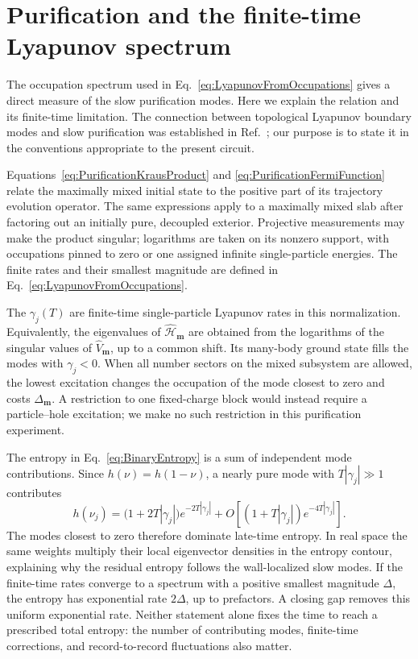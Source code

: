 \documentclass[aps,prb,10pt,twocolumn,superscriptaddress,longbibliography,floatfix]{revtex4-2}
\newcommand{\rec}{\mathbf m}   %
\begin{document}
{\color{blue}
\section{Purification and the finite-time Lyapunov spectrum}
\label{app:Lyapunov}

The occupation spectrum used in Eq.~\eqref{eq:LyapunovFromOccupations} gives a direct measure of the slow purification modes. Here we explain the relation and its finite-time limitation. The connection between topological Lyapunov boundary modes and slow purification was established in Ref.~\cite{XiaoKawabata2026}; our purpose is to state it in the conventions appropriate to the present circuit.

Equations~\eqref{eq:PurificationKrausProduct} and \eqref{eq:PurificationFermiFunction} relate the maximally mixed initial state to the positive part of its trajectory evolution operator. The same expressions apply to a maximally mixed slab after factoring out an initially pure, decoupled exterior. Projective measurements may make the product singular; logarithms are taken on its nonzero support, with occupations pinned to zero or one assigned infinite single-particle energies. The finite rates and their smallest magnitude are defined in Eq.~\eqref{eq:LyapunovFromOccupations}.

The $\gamma_j(T)$ are finite-time single-particle Lyapunov rates in this normalization. Equivalently, the eigenvalues of $\hat{\mathcal H}_{\rec}$ are obtained from the logarithms of the singular values of $\hat V_{\rec}$, up to a common shift. Its many-body ground state fills the modes with $\gamma_j<0$. When all number sectors on the mixed subsystem are allowed, the lowest excitation changes the occupation of the mode closest to zero and costs $\Delta_{\rec}$. A restriction to one fixed-charge block would instead require a particle--hole excitation; we make no such restriction in this purification experiment.

The entropy in Eq.~\eqref{eq:BinaryEntropy} is a sum of independent mode contributions. Since $h(\nu)=h(1-\nu)$, a nearly pure mode with $T|\gamma_j|\gg1$ contributes
\begin{equation}
    h(\nu_j)=
    \big(1+2T|\gamma_j|\big)e^{-2T|\gamma_j|}
    +O\!\left[(1+T|\gamma_j|)e^{-4T|\gamma_j|}\right].
    \label{eq:PurificationEntropyAsymptotic}
\end{equation}
The modes closest to zero therefore dominate late-time entropy. In real space the same weights multiply their local eigenvector densities in the entropy contour, explaining why the residual entropy follows the wall-localized slow modes. If the finite-time rates converge to a spectrum with a positive smallest magnitude $\Delta$, the entropy has exponential rate $2\Delta$, up to prefactors. A closing gap removes this uniform exponential rate. Neither statement alone fixes the time to reach a prescribed total entropy: the number of contributing modes, finite-time corrections, and record-to-record fluctuations also matter.

}
\end{document}
